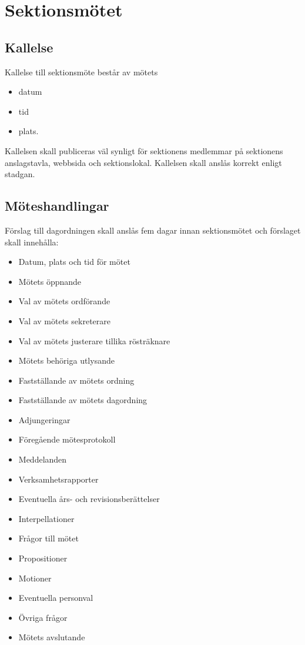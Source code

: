 \section{Sektionsmötet}

\subsection{Kallelse}
Kallelse till sektionsmöte består av mötets
\begin{itemize}
    \item datum
    \item tid
    \item plats.
\end{itemize}

Kallelsen skall publiceras väl synligt för sektionens medlemmar på sektionens anslagstavla, webbsida och sektionslokal. Kallelsen skall anslås korrekt enligt stadgan. 

\subsection{Möteshandlingar}
Förslag till dagordningen skall anslås fem dagar innan sektionsmötet och förslaget skall innehålla:

\begin{itemize}
	\item Datum, plats och tid för mötet
	\item Mötets öppnande
	\item Val av mötets ordförande
	\item Val av mötets sekreterare
	\item Val av mötets justerare tillika rösträknare
	\item Mötets behöriga utlysande
    \item Fastställande av mötets ordning
	\item Fastställande av mötets dagordning
	\item Adjungeringar
	\item Föregående mötesprotokoll
	\item Meddelanden
	\item Verksamhetsrapporter
	\item Eventuella års- och revisionsberättelser
	\item Interpellationer
    \item Frågor till mötet
    \item Propositioner
	\item Motioner
	\item Eventuella personval
	\item Övriga frågor
	\item Mötets avslutande
\end{itemize}

